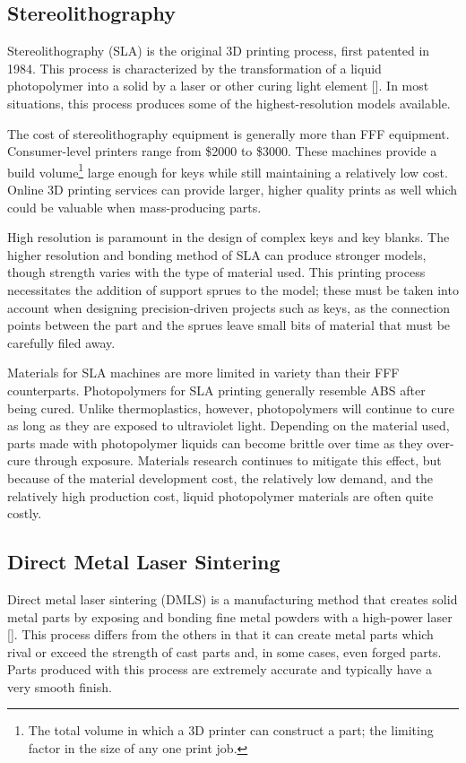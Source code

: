 \documentclass{acm_proc_article-sp}
\begin{document}
\subsection{Stereolithography}
Stereolithography (SLA) is the original 3D printing process, first patented in 1984. This process is characterized by the transformation of a liquid photopolymer into a solid by a laser or other curing light element [\citealt{HULL}]. In most situations, this process produces some of the highest-resolution models available.

The cost of stereolithography equipment is generally more than FFF equipment. Consumer-level printers range from \$2000 to \$3000. These machines provide a build volume\footnote{The total volume in which a 3D printer can construct a part; the limiting factor in the size of any one print job.} large enough for keys while still maintaining a relatively low cost. Online 3D printing services can provide larger, higher quality prints as well which could be valuable when mass-producing parts.

High resolution is paramount in the design of complex keys and key blanks. The higher resolution and bonding method of SLA can produce stronger models, though strength varies with the type of material used. This printing process necessitates the addition of support sprues to the model; these must be taken into account when designing precision-driven projects such as keys, as the connection points between the part and the sprues leave small bits of material that must be carefully filed away.

Materials for SLA machines are more limited in variety than their FFF counterparts. Photopolymers for SLA printing generally resemble ABS after being cured. Unlike thermoplastics, however, photopolymers will continue to cure as long as they are exposed to ultraviolet light. Depending on the material used, parts made with photopolymer liquids can become brittle over time as they over-cure through exposure. Materials research continues to mitigate this effect, but because of the material development cost, the relatively low demand, and the relatively high production cost, liquid photopolymer materials are often quite costly.

\subsection{Direct Metal Laser Sintering}
Direct metal laser sintering (DMLS) is a manufacturing method that creates solid metal parts by exposing and bonding fine metal powders with a high-power laser [\citealt{DAS}]. This process differs from the others in that it can create metal parts which rival or exceed the strength of cast parts and, in some cases, even forged parts. Parts produced with this process are extremely accurate and typically have a very smooth finish.
\end{document}
